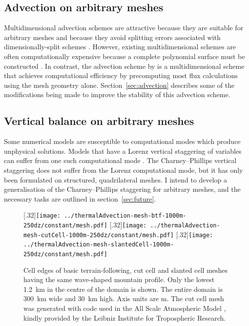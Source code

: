 \documentclass[a4paper,11pt]{article}
\begin{document}
\subsection*{Advection on arbitrary meshes}
Multidimensional advection schemes are attractive because they are suitable for arbitrary meshes \citep{dubey2014} and because they avoid splitting errors associated with dimensionally-split schemes \citep{leonard1993}.
However, existing multidimensional schemes are often computationally expensive because a complete polynomial surface must be constructed \citep{skamarock-menchaca2010}.
In contrast, the advection scheme by \citet{weller-shahrokhi2014} is a multidimensional scheme that achieves computational efficiency by precomputing most flux calculations using the mesh geometry alone.
Section~\ref{sec:advection} describes some of the modifications being made to improve the stability of this advection scheme.

\subsection*{Vertical balance on arbitrary meshes}
Some numerical models are susceptible to computational modes which produce unphysical solutions.   Models that have a Lorenz vertical staggering of variables can suffer from one such computational mode \citep{arakawa-konor1996}.  The Charney--Phillips vertical staggering does not suffer from the Lorenz computational mode, but it has only been formulated on structured, quadrilateral meshes.  I intend to develop a generalisation of the Charney--Phillips staggering for arbitrary meshes, and the necessary tasks are outlined in section~\ref{sec:future}.

\begin{figure}
	\centering
	[.32\linewidth]{\texttt{[image: ../thermalAdvection-mesh-btf-1000m-250dz/constant/mesh.pdf]}}
	[.32\linewidth]{\texttt{[image: ../thermalAdvection-mesh-cutCell-1000m-250dz/constant/mesh.pdf]}}
	[.32\linewidth]{\texttt{[image: ../thermalAdvection-mesh-slantedCell-1000m-250dz/constant/mesh.pdf]}}
	\caption{Cell edges of basic terrain-following, cut cell and slanted cell meshes having the same wave-shaped mountain profile.  Only the lowest \SI{1.2}{\kilo\meter} in the centre of the domain is shown.  The entire domain is \SI{300}{\kilo\meter} wide and \SI{30}{\kilo\meter} high.  Axis units are \si{\meter}.
The cut cell mesh was generated with code used in the All Scale Atmospheric Model \citep{jaehn2015}, kindly provided by the Leibniz Institute for Tropospheric Research.}
	\label{fig:meshes}
\end{figure}
\end{document}
